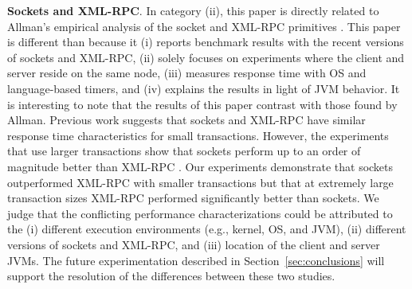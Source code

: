 \documentclass{sig-alternate}
\begin{document}
{\bf Sockets and XML-RPC}. In category (ii), this paper is directly
related to Allman's empirical analysis of the socket and XML-RPC
primitives \cite{allman-per}.  This paper is different than
\cite{allman-per} because it (i) reports benchmark results with the
recent versions of sockets and XML-RPC, (ii) solely focuses on
experiments where the client and server reside on the same node, (iii)
measures response time with OS and language-based timers, and (iv)
explains the results in light of JVM behavior.  It is interesting to
note that the results of this paper contrast with those found by
Allman.  Previous work suggests that sockets and XML-RPC have similar
response time characteristics for small transactions.  However, the
experiments that use larger transactions show that sockets perform up
to an order of magnitude better than XML-RPC \cite{allman-per}.  Our
experiments demonstrate that sockets outperformed XML-RPC with smaller
transactions but that at extremely large transaction sizes XML-RPC
performed significantly better than sockets.  We judge that the
conflicting performance characterizations could be attributed to the
(i) different execution environments (e.g., kernel, OS, and JVM), (ii)
different versions of sockets and XML-RPC, and (iii) location of the
client and server JVMs.  The future experimentation described in
Section~\ref{sec:conclusions} will support the resolution of the
differences between these two studies.


\end{document}
